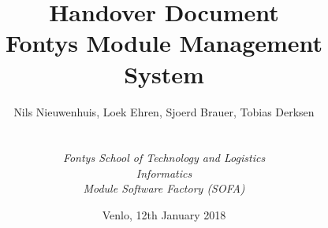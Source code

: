 

\def\Company{Fontys Sofa Group 1}
\def\Institute{\textit{Fontys School of Technology and Logistics}}
\def\Course{\textit{Informatics}}
\def\Module{\textit{Module Software Factory (SOFA)}}

\def\BoldTitle{Handover Document}
\def\Subtitle{Fontys Module Management System}
\def\Authors{Nils Nieuwenhuis, Loek Ehren, Sjoerd Brauer, Tobias Derksen}


\title{\textbf{\BoldTitle}\\\Subtitle}
\author{\Authors \\ \\ \\ \Institute\\ \Course\\ \Module}
\date{Venlo, 12th January 2018}
